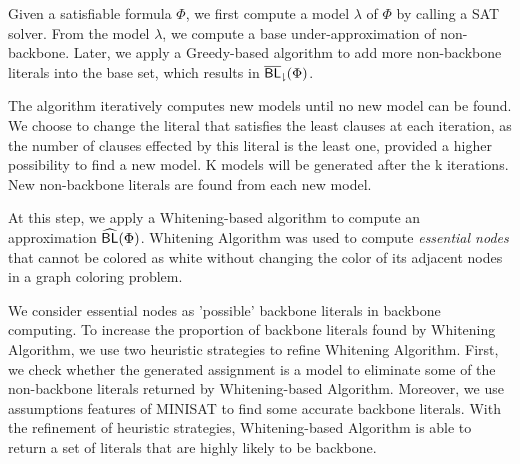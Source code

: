 
\medskip
{}
Given a satisfiable formula $\Phi$, we first compute a model $\lambda$ of $\Phi$ by calling a SAT solver.
From the model $\lambda$, we compute a base under-approximation of non-backbone.
Later, we apply a Greedy-based algorithm to add more non-backbone literals into the base set, which results in ${\sf \overline{BL}_\downharpoonright}(\Phi)$.

The algorithm iteratively computes new models until no new model can be found. We choose to change the literal that satisfies the least clauses at each iteration, as the number of clauses effected by this literal is the least one, provided a higher possibility to find a new model. K models will be generated after the k iterations. New non-backbone literals are found from each new model.

\medskip
{}
At this step, we apply a Whitening-based algorithm to compute an approximation ${\sf \widehat{BL}}(\Phi)$.
Whitening Algorithm was used to compute \emph{essential nodes} that cannot be colored as white without changing the color of its adjacent nodes in a graph coloring problem.


We consider essential nodes as 'possible' backbone literals in backbone computing.
To increase the proportion of backbone literals found by Whitening Algorithm, we use two heuristic strategies to refine Whitening Algorithm.
First, we check whether the generated assignment is a model to eliminate some of the non-backbone literals returned by Whitening-based Algorithm.
Moreover, we use assumptions features of MINISAT \cite{JLM15} to find some accurate backbone literals.
With the refinement of heuristic strategies, Whitening-based Algorithm is able to return a set of literals that are highly likely to be backbone.


